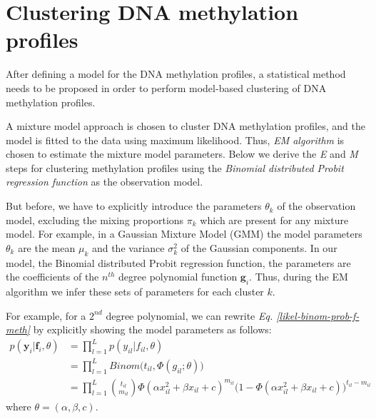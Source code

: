 \section{Clustering DNA methylation profiles} \label{cluster-meth-s}
After defining a model for the DNA methylation profiles, a statistical method needs to be proposed in order to perform model-based clustering of DNA methylation profiles. 

A mixture model approach \citep{McLachlan1988} is chosen to cluster DNA methylation profiles, and the model is fitted to the data using maximum likelihood. Thus, \emph{EM algorithm} \citep{Dempster1977} is chosen to estimate the mixture model parameters. Below we derive the \emph{E} and \emph{M} steps for clustering methylation profiles using the \emph{Binomial distributed Probit regression function} as the observation model. 

But before, we have to explicitly introduce the parameters $\theta_{k}$ of the observation model, excluding the mixing proportions $\pi_{k}$ which are present for any mixture model. For example, in a Gaussian Mixture Model (GMM) the model parameters $\theta_{k}$ are the mean $\mu_{k}$ and the variance $\sigma_{k}^{2}$ of the Gaussian components. In our model, the Binomial distributed Probit regression function, the parameters are the coefficients of the $n^{th}$ degree polynomial function $\mathbf{g}_{i}$. Thus, during the EM algorithm we infer these sets of parameters for each cluster $k$. 

For example, for a $2^{nd}$ degree polynomial, we can rewrite \emph{Eq. \ref{likel-binom-prob-f-meth}} by explicitly showing the model parameters as follows:
\begin{equation} \label{likel-binom-prob-example1-f-meth}
  \begin{split}
	p(\mathbf{y}_{i}|\mathbf{f}_{i}, \theta) & = \prod_{l=1}^{L} p(y_{il}|f_{il}, \theta) \\
							 & = \prod_{l=1}^{L} Binom \big(t_{il}, \Phi(g_{il}; \theta)\big) \\
							 & = \prod_{l=1}^{L} \binom{t_{il}}{m_{il}} \Phi(\alpha x_{il}^{2} + \beta x_{il} + c)^{m_{il}} (1 - \Phi(\alpha x_{il}^{2} + \beta x_{il} + c)\big)^{t_{il} - m_{il}}
  \end{split}
\end{equation}
where $\theta = (\alpha, \beta, c)$.

